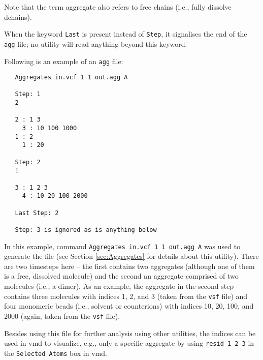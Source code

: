 Note that the term aggregate also refers to free chains (i.e., fully
dissolve dchains).

When the keyword \texttt{Last} is present instead of \texttt{Step}, it
signalises the end of the \texttt{agg} file; no utility will read anything
beyond this keyword.

Following is an example of an \texttt{agg} file:

\begin{verbatim}
   Aggregates in.vcf 1 1 out.agg A

   Step: 1
   2

   2 : 1 3
     3 : 10 100 1000
   1 : 2
     1 : 20

   Step: 2
   1

   3 : 1 2 3
     4 : 10 20 100 2000

   Last Step: 2

   Step: 3 is ignored as is anything below
\end{verbatim}

In this example, command \texttt{Aggregates in.vcf 1 1 out.agg A} was used
to generate the file (see Section \ref{sec:Aggregates} for details about
this utility). There are two timesteps here -- the first contains two
aggregates (although one of them is a free, dissolved molecule) and the
second an aggregate comprised of two molecules (i.e., a dimer). As an
example, the aggregate in the second step contains three molecules with
indices 1, 2, and 3 (taken from the \texttt{vsf} file) and four monomeric
beads (i.e., solvent or counterions) with indices 10, 20, 100, and 2000
(again, taken from the \texttt{vsf} file).

Besides using this file for further analysis using other utilities, the
indices can be used in vmd to visualize, e.g., only a specific aggregate by
using \texttt{resid 1 2 3} in the \texttt{Selected Atoms} box in vmd.
